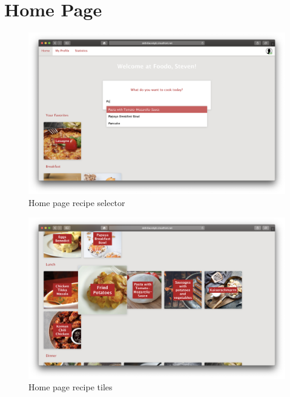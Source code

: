 \section*{Home Page}
\vspace{-2em}
\begin{figure}[H]
	\captionsetup{justification=centering}
	\begin{center}
		\includegraphics[scale=0.25]{Ressourcen/img/screenshots/screenshotF.png}
		\vspace{-3em}
		\caption{Home page recipe selector }
	\end{center}
\end{figure}
\vspace{-2em}
\begin{figure}[H]
	\captionsetup{justification=centering}
	\begin{center}
		\includegraphics[scale=0.25]{Ressourcen/img/screenshots/screenshotG.png}
		\vspace{-3em}
		\caption{Home page recipe tiles}
	\end{center}
\end{figure}
